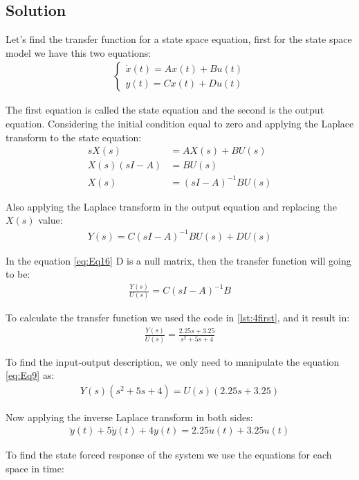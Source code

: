 \documentclass[a4paper,11pt]{article}
\begin{document}
\subsection*{Solution} 
\par Let's find the transfer function for a state space equation, first for the state space model we have this two equations:
\begin{align*}
\begin{cases}
\dot{x}(t)=Ax(t)+Bu(t)\\
y(t)=Cx(t)+Du(t)
\end{cases}
\end{align*}
\par The first equation is called the state equation and the second is the output equation. Considering the initial condition equal to zero and applying the Laplace transform to the state equation:
\begin{align*}
sX(s) &=AX(s)+BU(s)\\
X(s)(sI-A)&=BU(s)\\
X(s) &= (sI-A)^{-1}BU(s)
\end{align*}
\par Also applying the Laplace transform in the output equation and replacing the $X(s)$ value:
\begin{align*}
Y(s)= C(sI-A)^{-1}BU(s)+ DU(s)
\end{align*} 
\par In the equation \eqref{eq:Eq16} D is a null matrix, then the transfer function will going to be:
\begin{align}
\frac{Y(s)}{U(s)}=C(sI-A)^{-1}B
\end{align}
\par To calculate the transfer function we used the code in \ref{lst:4first}, and it result in:
\begin{align}
\label{eq:Eq17}
\frac{Y(s)}{U(s)}=\frac{2.25 s + 3.25}{s^2 + 5 s + 4}
\end{align}
\par To find the input-output description, we only need to manipulate the equation \eqref{eq:Eq9} as:
\begin{align*}
Y(s)(s^2+5s+4)=U(s)(2.25s+3.25)
\end{align*}
\par Now applying the inverse Laplace transform in both sides:
\begin{align}
\ddot{y}(t)+5\dot{y}(t)+4y(t) = 2.25\dot{u}(t)+3.25u(t)
\end{align}
\par To find the state forced response of the system we use the equations for each space in time:
\end{document}
